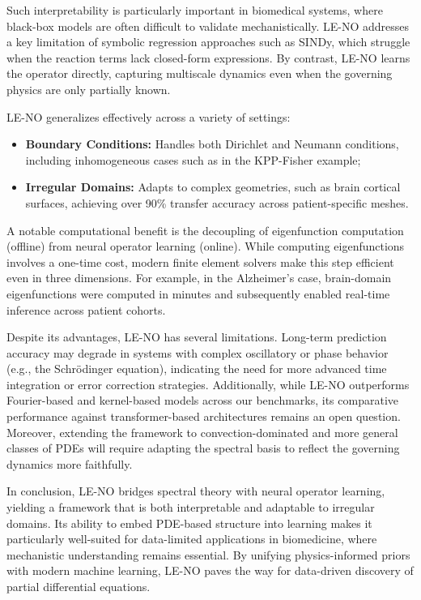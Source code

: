 \documentclass[preprint,12pt]{elsarticle}
\theoremstyle{plain}
\numberwithin{figure}{section}
\numberwithin{table}{section}
\begin{document}
Such interpretability is particularly important in biomedical systems, where black-box models are often difficult to validate mechanistically. LE-NO addresses a key limitation of symbolic regression approaches such as SINDy, which struggle when the reaction terms lack closed-form expressions. By contrast, LE-NO learns the operator directly, capturing multiscale dynamics even when the governing physics are only partially known.

LE-NO generalizes effectively across a variety of settings:
\begin{itemize}
	\item \textbf{Boundary Conditions:} Handles both Dirichlet and Neumann conditions, including inhomogeneous cases such as in the KPP-Fisher example;
	\item \textbf{Irregular Domains:} Adapts to complex geometries, such as brain cortical surfaces, achieving over 90\% transfer accuracy across patient-specific meshes.
\end{itemize}

A notable computational benefit is the decoupling of eigenfunction computation (offline) from neural operator learning (online). While computing eigenfunctions involves a one-time cost, modern finite element solvers make this step efficient even in three dimensions. For example, in the Alzheimer’s case, brain-domain eigenfunctions were computed in minutes and subsequently enabled real-time inference across patient cohorts.

Despite its advantages, LE-NO has several limitations. Long-term prediction accuracy may degrade in systems with complex oscillatory or phase behavior (e.g., the Schrödinger equation), indicating the need for more advanced time integration or error correction strategies. Additionally, while LE-NO outperforms Fourier-based and kernel-based models across our benchmarks, its comparative performance against transformer-based architectures remains an open question. Moreover, extending the framework to convection-dominated and more general classes of PDEs will require adapting the spectral basis to reflect the governing dynamics more faithfully.

In conclusion, LE-NO bridges spectral theory with neural operator learning, yielding a framework that is both interpretable and adaptable to irregular domains. Its ability to embed PDE-based structure into learning makes it particularly well-suited for data-limited applications in biomedicine, where mechanistic understanding remains essential. By unifying physics-informed priors with modern machine learning, LE-NO paves the way for data-driven discovery of partial differential equations.
\end{document}
